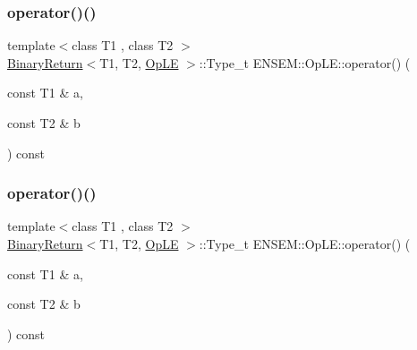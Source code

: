 \subsubsection{\texorpdfstring{operator()()}{operator()()}\hspace{0.1cm}{\footnotesize\ttfamily [1/3]}}
{\footnotesize\ttfamily template$<$class T1 , class T2 $>$ \\
\mbox{\hyperlink{structENSEM_1_1BinaryReturn}{Binary\+Return}}$<$T1, T2, \mbox{\hyperlink{structENSEM_1_1OpLE}{Op\+LE}} $>$\+::Type\+\_\+t E\+N\+S\+E\+M\+::\+Op\+L\+E\+::operator() (\begin{DoxyParamCaption}\item[{const T1 \&}]{a,  }\item[{const T2 \&}]{b }\end{DoxyParamCaption}) const\hspace{0.3cm}{\ttfamily [inline]}}

\mbox{\label{structENSEM_1_1OpLE_aecbfd8b265536bef6bc1dc2a124858ae}} 
\subsubsection{\texorpdfstring{operator()()}{operator()()}\hspace{0.1cm}{\footnotesize\ttfamily [2/3]}}
{\footnotesize\ttfamily template$<$class T1 , class T2 $>$ \\
\mbox{\hyperlink{structENSEM_1_1BinaryReturn}{Binary\+Return}}$<$T1, T2, \mbox{\hyperlink{structENSEM_1_1OpLE}{Op\+LE}} $>$\+::Type\+\_\+t E\+N\+S\+E\+M\+::\+Op\+L\+E\+::operator() (\begin{DoxyParamCaption}\item[{const T1 \&}]{a,  }\item[{const T2 \&}]{b }\end{DoxyParamCaption}) const\hspace{0.3cm}{\ttfamily [inline]}}

\mbox{\label{structENSEM_1_1OpLE_aecbfd8b265536bef6bc1dc2a124858ae}} 
